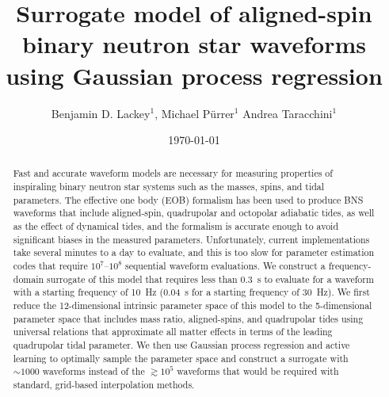 \documentclass[prd,aps,letter,twocolumn,floatfix,notitlepage,nofootinbib]{revtex4-1}
\begin{document}
\title{Surrogate model of aligned-spin binary neutron star waveforms using Gaussian process regression}

\author{
Benjamin D. Lackey$^1$, 
Michael P\"{u}rrer$^1$
Andrea Taracchini$^1$
}

\date{\today}

\begin{abstract}

Fast and accurate waveform models are necessary for measuring properties of inspiraling binary neutron star systems such as the masses, spins, and tidal parameters. The effective one body (EOB) formalism has been used to produce BNS waveforms that include aligned-spin, quadrupolar and octopolar adiabatic tides, as well as the effect of dynamical tides, and the formalism is accurate enough to avoid significant biases in the measured parameters. Unfortunately, current implementations take several minutes to a day to evaluate, and this is too slow for parameter estimation codes that require $10^7$--$10^8$ sequential waveform evaluations. We construct a frequency-domain surrogate of this model that requires less than 0.3~s to evaluate for a waveform with a starting frequency of 10~Hz (0.04~s for a starting frequency of 30~Hz). We first reduce the 12-dimensional intrinsic parameter space of this model to the 5-dimensional parameter space that includes mass ratio, aligned-spins, and quadrupolar tides using universal relations that approximate all matter effects in terms of the leading quadrupolar tidal parameter. We then use Gaussian process regression and active learning to optimally sample the parameter space and construct a surrogate with $\sim 1000$ waveforms instead of the $\gtrsim 10^5$ waveforms that would be required with standard, grid-based interpolation methods. 


\end{abstract}


\maketitle
\end{document}
